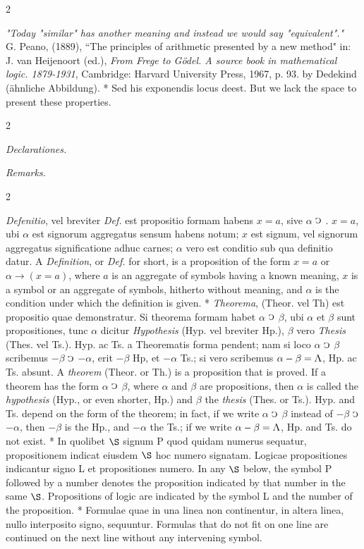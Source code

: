 \documentclass{book}
\newcommand{\C}{\mathop{\sbox0{$\displaystyle$$\reflectbox{C}$} %
\raisebox{-\height+\ht0-0.05cm}[\ht0][\dp0]{\scalebox{0.8}[0.8]{\copy0}}}\displaylimits} %
\newcommand{\abs}{\mathop{\rotatebox[origin=c]{180}{V}}}
\newcommand\peanoHeadingSmall[1]{ \vspace{0.75cm} \textit{#1} \nopagebreak[4]

\vspace{0.25cm} \nopagebreak[1]}
\newenvironment{translateTwoCol}
               { %
                 \columnratio{0.5, 0.5} \begin{paracol}{2}
                 \newcommand{\LAT}{\switchcolumn[0]*}
                 \newcommand{\ENG}{\switchcolumn[1]}
               }
               { %
                 \let\ENG\undefined
                 \let\LAT\undefined
                 \end{paracol}
               }
\begin{document}
\begin{translateTwoCol}
{\quad \emph{"Today "similar" has another meaning and instead we would say "equivalent"."} \\

G. Peano, (1889), ``The principles of arithmetic presented by a new method" in: J. van Heijenoort (ed.), \emph{From Frege to G\"odel. A source book in mathematical logic. 1879-1931}, Cambridge: Harvard University Press, 1967, p. 93.} by Dedekind (\"ahnliche Abbildung).
\LAT
Sed his exponendis locus deest.
\ENG
But we lack the space to present these properties.
\end{translateTwoCol}

\begin{translateTwoCol}
\centering
{}
{}
\peanoHeadingSmall{Declarationes.}
\ENG
\peanoHeadingSmall{Remarks.}
\end{translateTwoCol}

\begin{translateTwoCol}
\emph{Defenitio}, vel breviter \emph{Def.} est propositio formam habens $x = a$, sive $\alpha$ $\C$ . $x = a$, ubi $\alpha$ est signorum aggregatus sensum habens notum; $x$ est signum, vel signorum aggregatus significatione adhuc carnes; $\alpha$ vero est conditio sub qua definitio datur.
\ENG
A \emph{Definition}, or \emph{Def.} for short, is a proposition of the form $x=a$ or $\alpha \rightarrow (x = a)$, where $a$ is an aggregate of symbols having a known meaning, $x$ is a symbol or an aggregate of symbols, hitherto without meaning, and $\alpha$ is the condition under which the definition is given.
\LAT
\emph{Theorema}, (Theor. vel Th) est propositio quae demonstratur. Si theorema formam habet $\alpha$ $\C$ $\beta$, ubi $\alpha$ et $\beta$ sunt propositiones, tunc $\alpha$ dicitur \emph{Hypothesis} (Hyp. vel breviter Hp.), $\beta$ vero \emph{Thesis} (Thes. vel Ts.). Hyp. ac Ts. a Theorematis forma pendent; nam si loco $\alpha$ $\C$ $\beta$ scribemus $- \beta$ $\C$ $- \alpha$, erit $- \beta$ Hp, et $- \alpha$ Ts.; si vero scribemus $\alpha - \beta = \abs$, Hp. ac Ts. absunt.
\ENG
A \emph{theorem} (Theor. or Th.) is a proposition that is proved. If a theorem has the form $\alpha$ $\C$ $\beta$, where $\alpha$ and $\beta$ are propositions, then $\alpha$ is called the \emph{hypothesis} (Hyp., or even shorter, Hp.) and $\beta$ the \emph{thesis} (Thes. or Ts.). Hyp. and Ts. depend on the form of the theorem; in fact, if we write $\alpha$ $\C$ $\beta$ instead of $- \beta$ $\C$ $- \alpha$, then $- \beta$ is the Hp., and $- \alpha$ the Ts.; if we write $\alpha - \beta = \abs$, Hp. and Ts. do not exist.
\LAT
In quolibet $\S$ signum P quod quidam numerus sequatur, propositionem indicat eiusdem $\S$ hoc numero signatam. Logicae propositiones indicantur signo L et propositiones numero.
\ENG
In any $\S$ below, the symbol P followed by a number denotes the proposition indicated by that number in the same $\S$. Propositions of logic are indicated by the symbol L and the number of the proposition.
\LAT
Formulae quae in una linea non continentur, in altera linea, nullo interposito signo, sequuntur.
\ENG
Formulas that do not fit on one line are continued on the next line without any intervening symbol.
\end{translateTwoCol}
\end{document}
